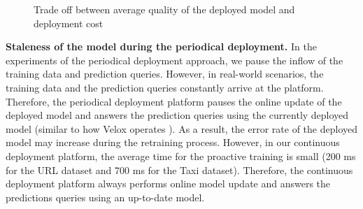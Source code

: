 \begin{figure}[!h]
\centering
\resizebox{\columnwidth}{!}{}
\caption{Trade off between average quality of the deployed model and deployment cost}
\label{trade-off-figure}
\end{figure}

\textbf{Staleness of the model during the periodical deployment.}
In the experiments of the periodical deployment approach, we pause the inflow of the training data and prediction queries.
However, in real-world scenarios, the training data and the prediction queries constantly arrive at the platform.
Therefore, the periodical deployment platform pauses the online update of the deployed model and answers the prediction queries using the currently deployed model (similar to how Velox operates \cite{crankshaw2014missing}).
As a result, the error rate of the deployed model may increase during the retraining process.
However, in our continuous deployment platform, the average time for the proactive training is small (200 ms for the URL dataset and 700 ms for the Taxi dataset).
Therefore, the continuous deployment platform always performs online model update and answers the predictions queries using an up-to-date model.


